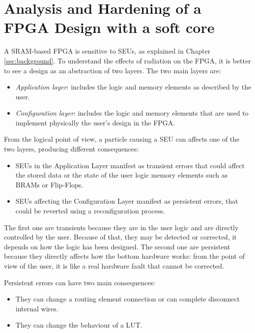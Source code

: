 \chapter{Analysis and Hardening of a FPGA Design with a soft core}

A SRAM-based FPGA is sensitive to SEUs, as explained in Chapter \ref{sec:background}. To understand the effects of radiation on the FPGA, it is better to see a design as an abstraction of two layers. The two main layers are:

\begin{itemize}
    \item \textit{Application layer}: includes the logic and memory elements as described by the user.
    \item \textit{Configuration layer}: includes the logic and memory elements that are used to implement physically the user's design in the FPGA.
\end{itemize}

From the logical point of view, a particle causing a SEU can affects one of the two layers, producing different consequences:

\begin{itemize}
    \item SEUs in the Application Layer manifest as transient errors that could affect the stored data or the state of the user logic memory elements such as BRAMs or Flip-Flops. 
    \item SEUs affecting the Configuration Layer manifest as persistent errors, that could be reverted using a reconfiguration process. 
\end{itemize}

The first one are transients because they are in the user logic and are directly controlled by the user. Because of that, they may be detected or corrected, it depends on how the logic has been designed. The second one are persistent because they directly affects how the bottom hardware works: from the point of view of the user, it is like a real hardware fault that cannot be corrected. \bigskip

Persistent errors can have two main consequences:

\begin{itemize}
    \item They can change a routing element connection or can complete disconnect internal wires.
    \item They can change the behaviour of a LUT.
\end{itemize}

